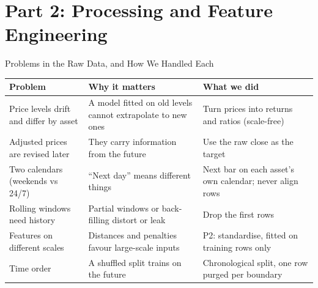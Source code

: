 \documentclass[aspectratio=169,11pt]{beamer}
\newcommand{\currentspeaker}{}
\newcommand{\speaker}[1]{\gdef\currentspeaker{#1}}
\newcounter{progresssection}
\newcommand{\progresssection}[1]{\setcounter{progresssection}{#1}}
\newcommand{\act}[1]{\section{#1}}
\begin{document}
\act{Part 2: Processing and Feature Engineering}
\progresssection{2}

\begin{frame}{Problems in the Raw Data, and How We Handled Each}
  \speaker{Zhang Yancheng}
  \centering\footnotesize
  \renewcommand{\arraystretch}{1.22}
  \begin{tabular}{@{}>{\raggedright\arraybackslash}p{.27\linewidth}>{\raggedright\arraybackslash}p{.31\linewidth}>{\raggedright\arraybackslash}p{.36\linewidth}@{}}
    \toprule
    \textbf{Problem} & \textbf{Why it matters} & \textbf{What we did} \\
    \midrule
    Price levels drift and differ by asset & A model fitted on old levels cannot extrapolate to new ones & Turn prices into returns and ratios (scale-free) \\
    Adjusted prices are revised later & They carry information from the future & Use the raw close as the target \\
    Two calendars (weekends vs 24/7) & ``Next day'' means different things & Next bar on each asset's own calendar; never align rows \\
    Rolling windows need history & Partial windows or back-filling distort or leak & Drop the first \Warmup{} rows \\
    Features on different scales & Distances and penalties favour large-scale inputs & P2: standardise, fitted on training rows only \\
    Time order & A shuffled split trains on the future & Chronological split, one row purged per boundary \\
    \bottomrule
  \end{tabular}
\end{frame}
\end{document}
